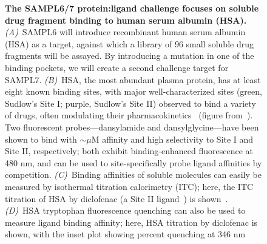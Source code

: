\documentclass[11pt]{article}
\begin{document}
\begin{figure}[h]
\begin{centering}

\end{centering}
\vspace{0.1in}
\caption{\footnotesize {\bf The SAMPL6/7 protein:ligand challenge focuses on soluble drug fragment binding to human serum albumin (HSA).}
\emph{(A)}~SAMPL6 will introduce recombinant human serum albumin (HSA) as a target, against which a library of 96 small soluble drug fragments will be assayed.
By introducing a mutation in one of the binding pockets, we will create a second challenge target for SAMPL7.
\emph{(B)}~HSA, the most abundant plasma protein, has at least eight known binding sites, with major well-characterized sites (green, Sudlow's Site I; purple, Sudlow's Site II) observed to bind a variety of drugs, often modulating their pharmacokinetics~\cite{Fasano:2005:IUBMBLife(InternationalUnionofBiochemistryandMolecularBiology:Life)a} (figure from~\cite{Hall:2013:JournalofChemicalInformationandModelinga}).
Two fluorescent probes---dansylamide and dansylglycine---have been shown to bind with $\sim$$\mu$M affinity and high selectivity to Site I and Site II, respectively; both exhibit binding-enhanced fluorescence at 480 nm, and can be used to site-specifically probe ligand affinities by competition.
\emph{(C)}~Binding affinities of soluble molecules can easily be measured by isothermal titration calorimetry (ITC); here, the ITC titration of HSA by diclofenac (a Site II ligand~\cite{Rafols:2014:Talantaa}) is shown~\cite{Bou-Abdallah:2016:TheJournalofChemicalThermodynamics}. 
\emph{(D)}~HSA tryptophan fluorescence quenching can also be used to measure ligand binding affinity; here, HSA titration by diclofenac is shown, with the inset plot showing percent quenching at 346 nm~\cite{Bou-Abdallah:2016:TheJournalofChemicalThermodynamics}
\label{figure:hsa-challenge}}
\end{figure}
\end{document}
